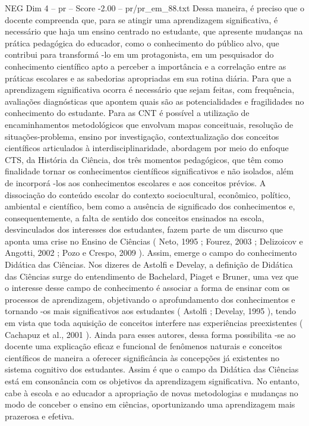 \begin{textsample}{NEG Dim 4 – pr – Score -2.00 – pr/pr\_em\_88.txt}
Dessa maneira, é preciso que o docente compreenda que, para se atingir uma aprendizagem significativa, é necessário que haja um ensino centrado no estudante, que apresente mudanças na prática pedagógica do educador, como o conhecimento do público alvo, que contribui para transformá -lo em um protagonista, em um pesquisador do conhecimento científico apto a perceber a importância e a correlação entre as práticas escolares e as sabedorias apropriadas em sua rotina diária.
Para que a aprendizagem significativa ocorra é necessário que sejam feitas, com frequência, avaliações diagnósticas que apontem quais são as potencialidades e fragilidades no conhecimento do estudante.
Para as CNT é possível a utilização de encaminhamentos metodológicos que envolvam mapas conceituais, resolução de situações-problema, ensino por investigação, contextualização dos conceitos científicos articulados à interdisciplinaridade, abordagem por meio do enfoque CTS, da História da Ciência, dos três momentos pedagógicos, que têm como finalidade tornar os conhecimentos científicos significativos e não isolados, além de incorporá -los aos conhecimentos escolares e aos conceitos prévios.
A dissociação do conteúdo escolar do contexto sociocultural, econômico, político, ambiental e científico, bem como a ausência de significado dos conhecimentos e, consequentemente, a falta de sentido dos conceitos ensinados na escola, desvinculados dos interesses dos estudantes, fazem parte de um discurso que aponta uma crise no Ensino de Ciências ( Neto, 1995 ; Fourez, 2003 ; Delizoicov e Angotti, 2002 ; Pozo e Crespo, 2009 ).
Assim, emerge o campo do conhecimento Didática das Ciências.
Nos dizeres de Astolfi e Develay, a definição de Didática das Ciências surge do entendimento de Bachelard, Piaget e Bruner, uma vez que o interesse desse campo de conhecimento é associar a forma de ensinar com os processos de aprendizagem, objetivando o aprofundamento dos conhecimentos e tornando -os mais significativos aos estudantes ( Astolfi ; Develay, 1995 ), tendo em vista que toda aquisição de conceitos interfere nas experiências preexistentes ( Cachapuz et al., 2001 ).
Ainda para esses autores, dessa forma possibilita -se ao docente uma explicação eficaz e funcional de fenômenos naturais e conceitos científicos de maneira a oferecer significância às concepções já existentes no sistema cognitivo dos estudantes.
Assim é que o campo da Didática das Ciências está em consonância com os objetivos da aprendizagem significativa.
No entanto, cabe à escola e ao educador a apropriação de novas metodologias e mudanças no modo de conceber o ensino em ciências, oportunizando uma aprendizagem mais prazerosa e efetiva.

\end{textsample}
